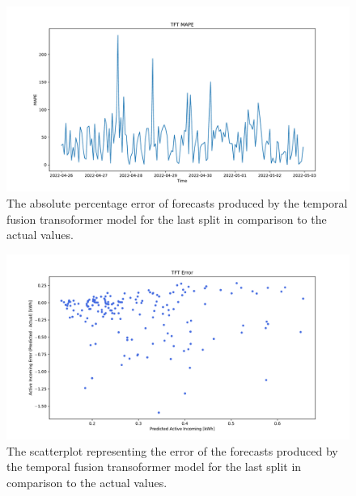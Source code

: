 \begin{figure}[H]
\centering
\includegraphics[width=1\textwidth]{images/baseline/TFT_mape}
\caption{The absolute percentage error of forecasts produced by the temporal fusion transoformer model for the last split in comparison to the actual values.}
\label{fig:baselinetfthourlyforecastsmape}
\end{figure}

\begin{figure}[H]
\centering
\includegraphics[width=1\textwidth]{images/baseline/TFT_error_scatter_plot_predicted}
\caption{The scatterplot representing the error of the forecasts produced by the temporal fusion transoformer model for the last split in comparison to the actual values.}
\label{fig:baselinetfthourlyforecastsscatterplot}
\end{figure}

